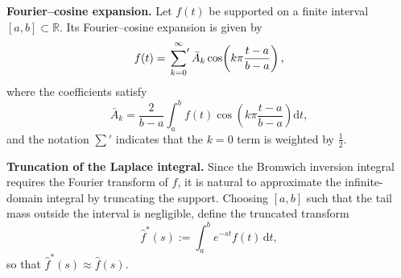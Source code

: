 \documentclass[11pt]{article}
\begin{document}
\medskip

\noindent
\textbf{Fourier--cosine expansion.}
Let $f(t)$ be supported on a finite interval $[a,b]\subset\mathbb{R}$. Its Fourier--cosine expansion is given by
\begin{equation}\label{sumcos}
    f(t)
    =
    \sideset{}{'}\sum_{k=0}^{\infty}
    \bar{A}_k
    \cos\!\left(k\pi\frac{t-a}{b-a}\right),
\end{equation}
where the coefficients satisfy
\begin{equation}\label{Ak}
    \bar{A}_k
    =
    \frac{2}{b-a}
    \int_{a}^{b}
    f(t)
    \cos\!\left(k\pi\frac{t-a}{b-a}\right)\mathrm{d}t,
\end{equation}
and the notation $\sum'$ indicates that the $k=0$ term is weighted by $\frac{1}{2}$.

\medskip

\noindent
\textbf{Truncation of the Laplace integral.}
Since the Bromwich inversion integral requires the Fourier transform of $f$, it is natural to approximate the infinite-domain integral by truncating the support.
Choosing $[a,b]$ such that the tail mass outside the interval is negligible, define the truncated transform
\begin{equation}\label{FT}
    \hat{f}^{*}(s)
    :=
    \int_{a}^{b} e^{-st}f(t)\,\mathrm{d}t,
\end{equation}
so that $\hat{f}^{*}(s)\approx \hat{f}(s)$.

\medskip
\end{document}
